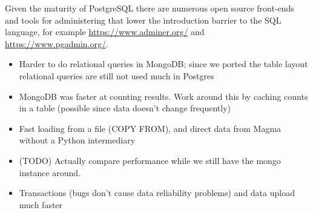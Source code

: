 \documentclass{article}
\begin{document}
Given the maturity of PostgreSQL there are numerous open source front-ends and tools for administering that lower the introduction barrier to the SQL language, for example \url{https://www.adminer.org/} and \url{https://www.pgadmin.org/}.

\begin{itemize}
\item Harder to do relational queries in MongoDB; since we ported the table layout relational queries are still not used much in Postgres
\item MongoDB was faster at counting results.  Work around this by caching counts in a table (possible since data doesn't change frequently)
\item Fast loading from a file (COPY FROM), and direct data from Magma without a Python intermediary
\item (TODO) Actually compare performance while we still have the mongo instance around.
\item Transactions (bugs don't cause data reliability problems) and data upload much faster
\end{itemize}
\end{document}
